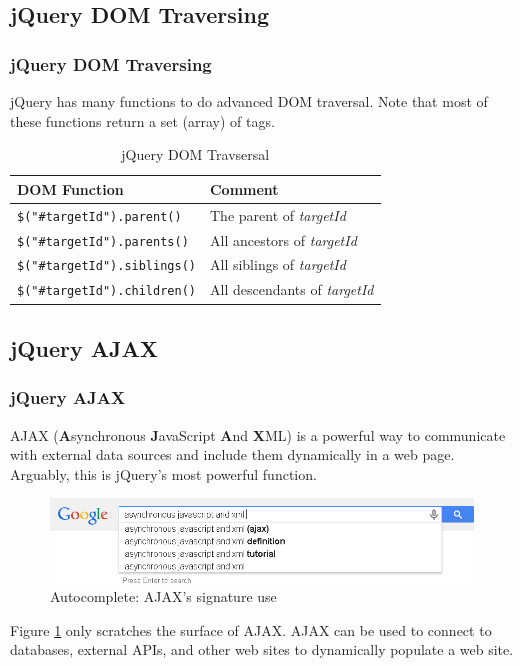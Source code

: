 \documentclass[aspectratio=169]{beamer}
\begin{document}
\subsection{jQuery DOM Traversing}
\begin{frame}
\frametitle{jQuery DOM Traversing}
jQuery has many functions to do advanced DOM traversal. Note that most of these functions return a set (array) of tags.
\begin{table}
\begin{tabular}{|l|l|}
\hline
\textbf{DOM Function} & \textbf{Comment}\\
\hline
\texttt{\$("\#targetId").parent()} & The parent of \textit{targetId}\\
\hline
\texttt{\$("\#targetId").parents()} & All ancestors of \textit{targetId}\\
\hline
\texttt{\$("\#targetId").siblings()} & All siblings of \textit{targetId}\\
\hline
\texttt{\$("\#targetId").children()} & All descendants of \textit{targetId}\\
\hline
\end{tabular}
\caption{jQuery DOM Travsersal \cite{jquery-traversing}}
\end{table}
\end{frame}

\subsection{jQuery AJAX}
\begin{frame}
\frametitle{jQuery AJAX}
AJAX (\textbf{A}synchronous \textbf{J}avaScript \textbf{A}nd \textbf{X}ML) is a powerful way to communicate with external data sources and include them dynamically in a web page. Arguably, this is jQuery's most powerful function.
\begin{figure}
\includegraphics[scale=0.25]{../artifacts/autocomplete.png}
\caption{Autocomplete: AJAX's signature use}
\label{fig:ajax}
\end{figure}
Figure \ref{fig:ajax} only scratches the surface of AJAX. AJAX can be used to connect to databases, external APIs, and other web sites to dynamically populate a web site.
\end{frame}
\end{document}

